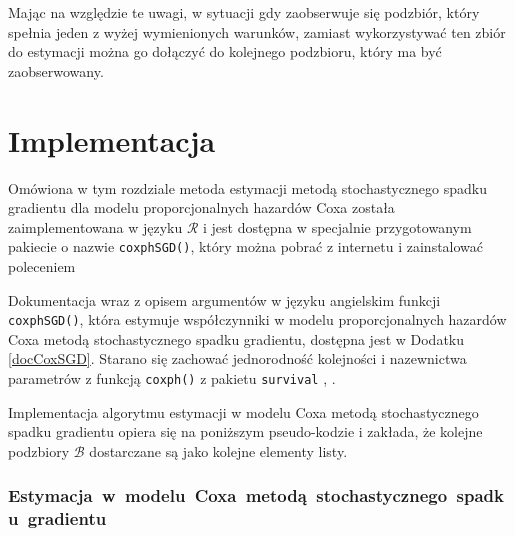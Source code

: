 Mając na względzie te uwagi, w sytuacji gdy zaobserwuje się podzbiór, który spełnia jeden z wyżej wymienionych warunków, zamiast wykorzystywać ten zbiór do estymacji można go dołączyć do kolejnego podzbioru, który ma być zaobserwowany.

\newpage
\section{Implementacja}\label{implemento}

Omówiona w tym rozdziale metoda estymacji metodą stochastycznego spadku gradientu dla modelu proporcjonalnych hazardów Coxa została zaimplementowana w języku $\mathcal{R}$ \cite{programikr} i jest dostępna w specjalnie przygotowanym pakiecie o nazwie \texttt{coxphSGD()}, który można pobrać z internetu i zainstalować poleceniem
\begin{Shaded}
\begin{Highlighting}[]
\NormalTok{(}\NormalTok{)}
\end{Highlighting}
\end{Shaded}

Dokumentacja wraz z opisem argumentów w języku angielskim funkcji \texttt{coxphSGD()}, która estymuje współczynniki w modelu
proporcjonalnych hazardów Coxa metodą stochastycznego spadku gradientu, dostępna jest w Dodatku \ref{docCoxSGD}.
Starano się zachować jednorodność kolejności i nazewnictwa parametrów z funkcją \texttt{coxph()} z pakietu \texttt{survival} \cite{ther}, \cite{survival}.

Implementacja algorytmu estymacji w modelu Coxa metodą stochastycznego spadku gradientu opiera się na poniższym pseudo-kodzie i zakłada, że kolejne podzbiory \(\mathcal{B}\) dostarczane są jako kolejne elementy listy.
\subsubsection{Estymacja~w~modelu~Coxa~metodą~stochastycznego~spadku~gradientu}


